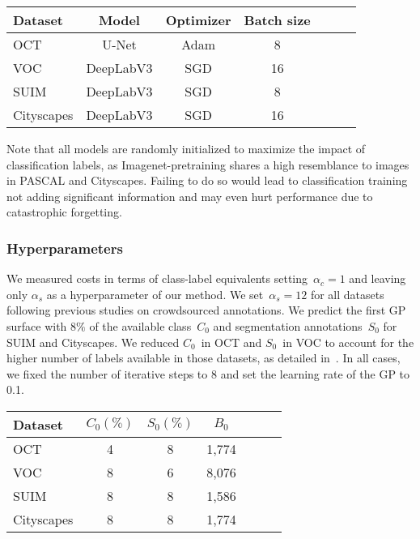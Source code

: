 \begin{table}
\centering
\begin{tabular}{lcccccc}
\toprule
{Dataset} & {Model} &  {Optimizer} & {Batch size} \\ \midrule
OCT & U-Net &  Adam & 8  \\
VOC & DeepLabV3 &  SGD & 16 \\
SUIM & DeepLabV3 &  SGD & 8  \\ 
Cityscapes & DeepLabV3 & SGD & 16   \\ \bottomrule
\end{tabular}
\end{table}

Note that all models are randomly initialized to maximize the impact of classification labels, as Imagenet-pretraining shares a high resemblance to images in PASCAL and Cityscapes. Failing to do so would lead to classification training not adding significant information and may even hurt performance due to catastrophic forgetting.

\subsubsection{Hyperparameters}
We measured costs in terms of class-label equivalents setting~$\alpha_c=1$ and leaving only $\alpha_s$ as a hyperparameter of our method. We set~$\alpha_s=12$ for all datasets following previous studies on crowdsourced annotations. We predict the first GP surface with $8\%$ of the available class~$C_0$ and segmentation annotations~$S_0$ for SUIM and Cityscapes. We reduced $C_0$~in OCT and $S_0$~in VOC to account for the higher number of labels available in those datasets, as detailed in~. In all cases, we fixed the number of iterative steps to 8 and set the learning rate of the GP to 0.1.

\begin{table}[h]
\centering
\begin{tabular}{lcccccc}
\toprule
{Dataset} & $C_0 (\%)$ & $S_0 (\%)$ & $B_0$ \\ \midrule
OCT & 4 & 8 & 1,774 \\
VOC & 8 & 6 & 8,076 \\
SUIM & 8 & 8 & 1,586 \\ 
Cityscapes & 8 & 8 & 1,774  \\ \bottomrule
\end{tabular}
\end{table}

